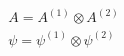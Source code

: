 \begin{equation}
\begin{array}{l}
A = A^{(1)} \otimes A^{(2)}\\
\psi= \psi^{(1)}\otimes \psi^{(2)}
\end{array}
\end{equation} 
